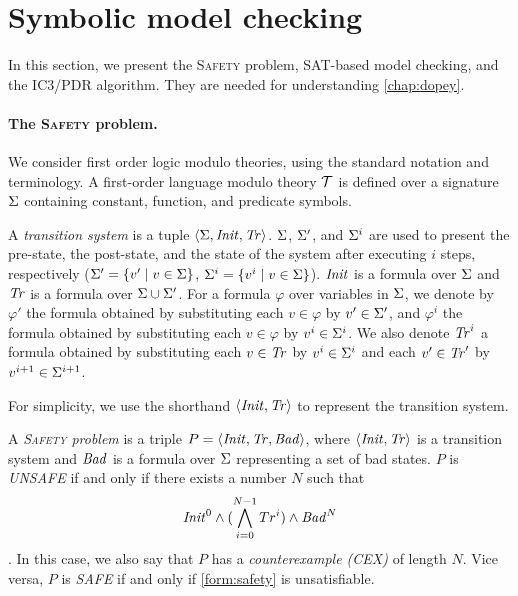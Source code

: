 \section{Symbolic model checking}
\newcommand{\safety}{\textsc{Safety}\xspace}
In this section, we present the \safety problem, SAT-based model checking, and the IC3/PDR algorithm. They are needed for understanding \cref{chap:dopey}.
\paragraph{The \safety problem.}

We consider first order logic modulo theories, using the standard notation and terminology. A first-order language modulo theory $\mathcal{T}$ is defined over a signature $\Sigma$ containing constant, function, and predicate symbols. 

A \emph{transition system} is a tuple $\langle \Sigma, \mathit{Init},
\mathit{Tr} \rangle$.
$\Sigma$, $\Sigma'$, and $\Sigma^i$ are used to present the pre-state, the post-state, and the state of the system after executing $i$ steps, respectively ($\Sigma' = \{v' \mid v \in \Sigma\}$, $\Sigma^i = \{v^i \mid v \in \Sigma\}$). 
$\mathit{Init}$ is a formula over $\Sigma$ and $\mathit{Tr}$ is a formula over $\Sigma \cup \Sigma'$. For a formula $\varphi$ over variables in $\Sigma$, we denote by $\varphi'$ the formula obtained by substituting each $v \in \varphi$ by $v' \in \Sigma'$, and $\varphi^i$ the formula obtained by substituting each $v \in \varphi$ by $v^i \in \Sigma^i$. We also denote $\mathit{Tr}^i$ a formula obtained by substituting each $v \in \mathit{Tr}$ by $v^i \in \Sigma^i$ and each $v' \in \mathit{Tr}'$ by $v^{i+1} \in \Sigma^{i+1}$.


For simplicity, we use the shorthand $\langle \mathit{Init}, \mathit{Tr}\rangle$ to represent the transition system.

A \emph{\safety problem} is a triple 
$P = \langle \mathit{Init}, \mathit{Tr}, \mathit{Bad} \rangle$, where
$\langle \mathit{Init}, \mathit{Tr} \rangle$ is a transition system and $\mathit{Bad}$ is a
formula over $\Sigma$ representing a set of bad states. $P$ is \emph{UNSAFE} if and only if there exists a number $N$ such that
\begin{align}
\label{form:safety}
    \mathit{Init}^0\land (\bigwedge^{N-1}_{i=0}Tr^i)\land \mathit{Bad}^N
\end{align}.
In this case, we also say that $P$ has a \emph{counterexample (CEX)} of length $N$. Vice versa, $P$ is \emph{SAFE} if and only if \cref{form:safety} is unsatisfiable.



